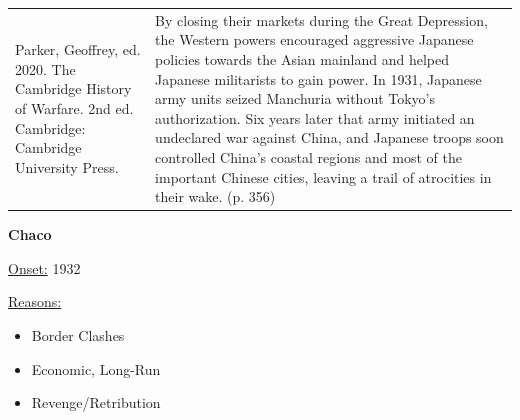 {\begin{longtable}{p{}p{}}
\\
Parker, Geoffrey, ed. 2020. The Cambridge History of Warfare. 2nd ed. Cambridge: Cambridge University Press. & By closing their markets during the Great Depression, the Western powers encouraged aggressive Japanese policies towards the Asian mainland and helped Japanese militarists to gain power. In 1931, Japanese army units seized Manchuria without Tokyo's authorization. Six years later that army initiated an undeclared war against China, and Japanese troops soon controlled China's coastal regions and most of the important Chinese cities, leaving a trail of atrocities in their wake.  (p. 356)
\\
\end{longtable}}
\clearpage
         \textbf{Chaco} 

          \underline{Onset:} 1932         

\underline{Reasons:}
\begin{itemize}
\item Border Clashes
\item Economic, Long-Run
\item Revenge/Retribution
\end{itemize}

